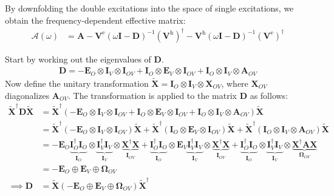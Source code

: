 By downfolding the double excitations into the space of single excitations, we obtain the frequency-dependent effective matrix:
\begin{align}
\mathcal{A}(\omega)
&= \mathbf{A} - \mathbf{V}^{\mathrm{e}}(\omega \mathbf{I} - \mathbf{D})^{-1} (\mathbf{V}^{\mathrm{h}})^{\dagger} - \mathbf{V}^{\mathrm{h}}(\omega \mathbf{I} - \mathbf{D})^{-1} (\mathbf{V}^{\mathrm{e}})^{\dagger}
\end{align}

Start by working out the eigenvalues of $\bm{D}$.
\begin{align}
    \bm{D} = -\bm{E}_{O} \otimes \bm{I}_V \otimes \bm{I}_{OV} + \bm{I}_O \otimes \bm{E}_{V} \otimes \bm{I}_{OV} + \bm{I}_O \otimes \bm{I}_V \otimes \bm{A}_{OV}
\end{align}
Now define the unitary transformation $\bm{\tilde{X}}=\bm{I}_O \otimes \bm{I}_V \otimes \bm{X}_{OV}$, where $\bm{X}_{OV}$ diagonalizes $\bm{A}_{OV}$. The transformation is applied to the matrix $\bm{D}$ as follows:
\begin{align}
    \bm{\tilde{X}}^\dagger \bm{D} \bm{\tilde{X}} &= \bm{\tilde{X}}^\dagger \left(-\bm{E}_{O} \otimes \bm{I}_V \otimes \bm{I}_{OV} + \bm{I}_O \otimes \bm{E}_{V} \otimes \bm{I}_{OV} + \bm{I}_O \otimes \bm{I}_V \otimes \bm{A}_{OV} \right) \bm{\tilde{X}}  \\
&= \bm{\tilde{X}}^\dagger \left(-\bm{E}_{O} \otimes \bm{I}_V \otimes \bm{I}_{OV}\right) \bm{\tilde{X}} + \bm{\tilde{X}}^\dagger \left(\bm{I}_O \otimes \bm{E}_{V} \otimes \bm{I}_{OV}\right) \bm{\tilde{X}} + \bm{\tilde{X}}^\dagger \left(\bm{I}_O \otimes \bm{I}_V \otimes \bm{A}_{OV}\right) \bm{\tilde{X}}  \\
&= -\bm{E}_{O} \underbrace{\bm{I}_O^\dag \bm{I}_O}_{\bm{I}_O} \otimes \underbrace{\bm{I}_V^\dag \bm{I}_V}_{\bm{I}_V} \otimes \underbrace{\bm{X}^\dag \bm{X}}_{\bm{I}_{OV}} + \underbrace{\bm{I}_O^\dag \bm{I}_O}_{\bm{I}_O} \otimes \bm{E}_{V} \underbrace{\bm{I}_V^\dag \bm{I}_V}_{\bm{I}_{V}} \otimes \underbrace{\bm{X}^\dag \bm{X}}_{\bm{I}_{OV}} + \underbrace{\bm{I}_O^\dag \bm{I}_O}_{\bm{I}_O} \otimes \underbrace{\bm{I}_V^\dag \bm{I}_V}_{\bm{I}_V} \otimes \underbrace{\bm{X}^\dag \bm{A}\bm{X}}_{\bm{\Omega}_{OV}} \\
&= -\bm{E}_{O} \oplus \bm{E}_{V} \oplus \bm{\Omega}_{OV} \\
\implies \bm{D} &= \bm{\tilde{X}} \left(-\bm{E}_O \oplus \bm{E}_V \oplus \bm{\Omega}_{OV}\right) \bm{\tilde{X}}^\dagger\\
\end{align}
